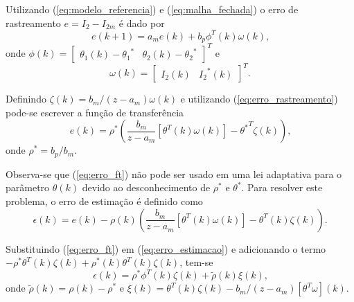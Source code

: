     Utilizando (\ref{eq:modelo_referencia}) e (\ref{eq:malha_fechada}) o erro de rastreamento $e = I_2 - I_{2m}$ é dado por
    \begin{equation}
        e (k+1) = a_m e(k) + b_p \phi^T (k) \omega (k) \text{,}
        \label{eq:erro_rastreamento}
    \end{equation}
    onde $\phi (k) = {\left[ \begin{matrix} \theta_1 (k) - {\theta_1}^* & \theta_2 (k) - {\theta_2}^*
    \end{matrix} \right]}^T$ e
    \begin{equation}
        \omega (k) = {\left[ \begin{matrix} I_2 (k) & {I_2}^* (k) \end{matrix} \right]}^T \text{.}
        \label{eq:omega_k}
    \end{equation}

    Definindo $\zeta (k) = b_m / (z - a_m) \omega (k)$ e utilizando (\ref{eq:erro_rastreamento}) pode-se escrever a função de transferência
    \begin{equation}
        e(k) = \rho^* \left( \frac{b_m}{z - a_m} \left[ \theta^T (k) \omega (k) \right]
            - {\theta^*}^T \zeta (k) \right) \text{,}
        \label{eq:erro_ft}
    \end{equation}
    onde $\rho^* = b_p / b_m$.

    Observa-se que (\ref{eq:erro_ft}) não pode ser usado em uma lei adaptativa para o parâmetro $\theta (k)$ devido ao desconhecimento de $\rho^*$ e $\theta^*$. Para resolver este problema, o erro de estimação é definido como
    \begin{equation}
        \epsilon (k) = e (k) - \rho(k) \left( \frac{b_m}{z - a_m} \left[ \theta^T (k) \omega(k)
            \right] - \theta^T (k) \zeta(k) \right) \text{.}
        \label{eq:erro_estimacao}
    \end{equation}

    Substituindo (\ref{eq:erro_ft}) em (\ref{eq:erro_estimacao}) e adicionando o termo $-\rho^* \theta^T (k) \zeta (k) + \rho^* (k) \theta^T (k) \zeta(k)$, tem-se
    \begin{equation}
        \epsilon(k) = \rho^* \phi^T(k) \zeta(k) + \tilde{\rho}(k) \xi(k) \text{,}
        \label{eq:epsilon_k}
    \end{equation}
    onde $\tilde{\rho}(k) = \rho(k) - \rho^*$ e $\xi(k) = \theta^T(k) \zeta(k) - b_m / (z - a_m)[\theta^T \omega](k)$.

